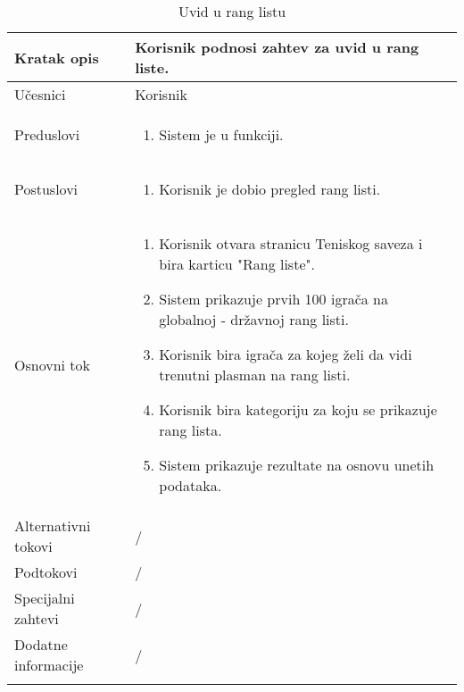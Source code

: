 \documentclass{article}
\begin{document}
    \begin{longtable}{| p{} | p{} |} 
        \hline
            Kratak opis & Korisnik podnosi zahtev za uvid u rang liste.\\ 
        \hline    
            Učesnici & Korisnik\\
        \hline
            Preduslovi & 
                \begin{enumerate}
                    \item Sistem je u funkciji.
                \end{enumerate}\\
        \hline  
            Postuslovi & 
                \begin{enumerate}
                    \item Korisnik je dobio pregled rang listi.
                \end{enumerate}\\
        \hline
            Osnovni tok & 
                \begin{enumerate}
                    \item Korisnik otvara stranicu Teniskog saveza i bira karticu "Rang liste".
                    \item Sistem prikazuje prvih 100 igrača na globalnoj - državnoj rang listi.
                    \item Korisnik bira igrača za kojeg želi da vidi trenutni plasman na rang listi.
                    \item Korisnik bira kategoriju za koju se prikazuje rang lista.
                    \item Sistem prikazuje rezultate na osnovu unetih podataka.
                \end{enumerate}\\
        \hline
            Alternativni tokovi & /\\
        \hline
            Podtokovi & /\\
        \hline
            Specijalni zahtevi & /\\
        \hline
            Dodatne informacije & /\\
        \hline
        \caption{Uvid u rang listu}
    \end{longtable}
\end{document}
